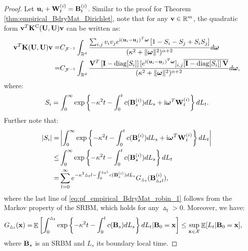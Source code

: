 \documentclass[aos,preprint]{imsart}
\theoremstyle{plain}
\DeclareMathOperator{\E}{\mathbb E}
\newcommand{\Real}{\mathbb R}
\newcommand{\CalX}{\mathcal X}
\newcommand{\BFx}{\bold x}
\newcommand{\BU}{\bold U}
\newcommand{\Bu}{\bold u}
\newcommand{\BK}{\bold K}
\newcommand{\im}{\text{i}}
\newcommand{\CalF}{\mathcal{F}}
\newcommand{\Bomega}{\boldsymbol{\omega}}
\theoremstyle{remark}
\begin{document}
\begin{proof}
Let $\Bu_i+\bold{W}^{(i)}_t=\bold{B}^{(i)}_t$. Similar to the proof for Theorem \ref{thm:empirical_BdryMat_Dirichlet}, note that for any $\bold{v}\in\Real^m$, the quadratic form $\bold{v}^T\BK^{\rm C}(\BU,\BU)\bold{v}$ can be written as:
\begin{align}
\begin{split}
     \bold{v}^T\BK(\BU,\BU)\bold{v}    =&C_{\CalF^{-1}}\int_{\Real^d}\frac{\sum_{i,j}v_iv_je^{\im(\Bu_i-\Bu_j)^T\Bomega}\left[1-S_i-S_j+S_{i}S_j\right]}{(\kappa^2+\|\Bomega\|^2)^{\alpha+2}}d\Bomega\\
    =& C_{\CalF^{-1}}\int_{\Real^d}\frac{{\bold{V}}^T\left[\bold{I}-\text{diag}[S_i]\right][e^{\im (\Bu_i-\Bu_j)^T\Bomega}]_{i,j}\overline{\left[\bold{I}-\text{diag}[S_i]\right]{\bold{V}}}}{(\kappa^2+\|\Bomega\|^2)^{\alpha+2}}d\Bomega,
    \end{split}
\end{align}
where:
\begin{equation*}
    S_i=\int_0^\infty\exp\left\{-\kappa^2t-\int_0^tc(\bold{B}^{(i)}_s)dL_s+\im{\Bomega}^T{\bold{W}^{(i)}_t}\right\}dL_t.
\end{equation*}
Further note that:
\begin{align}
\begin{split}
    \left|S_i\right|=&\left|\int_0^\infty\exp\left\{-\kappa^2t-\int_0^tc(\bold{B}^{(i)}_s)dL_s+\im{\Bomega}^T{\bold{W}^{(i)}_t}\right\}dL_t\right|\\
    \leq & \int_0^\infty\exp\left\{-\kappa^2t-\int_0^tc(\bold{B}^{(i)}_s)dL_s\right\}dL_t\\
    =&\sum_{l=0}^\infty e^{-\kappa^2\vartriangle_t l-\int_0^{\vartriangle_t l}c(\bold{B}^{(i)}_s)dL_s}G_{\vartriangle_t}(\bold{B}^{(i)}_{\vartriangle_t l}),\label{eq:pf_empirical_BdryMat_robin_1}
\end{split}
\end{align}
where the last line of \eqref{eq:pf_empirical_BdryMat_robin_1} follows from the Markov property of the SRBM, which holds for any $\vartriangle_t>0$. Moreover, we have:
\begin{align}
    G_{\vartriangle_t}(\BFx)=&\E\left[\int_0^{\vartriangle_t}\exp\left\{-\kappa^2t-\int_0^tc(\bold{B}_s)dL_s\right\}dL_t|\bold{B}_0=\BFx \right]\leq \sup_{\BFx\in\CalX}\E[L_t|\bold{B}_0=\BFx],\label{eq:pf_empirical_BdryMat_robin_2}
\end{align}
where $\bold{B}_s$ is an SRBM and $L_s$ its boundary local time.


\end{proof}
\end{document}
